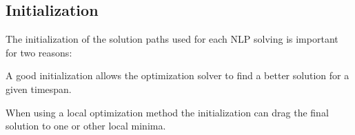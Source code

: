 \documentclass[eprint]{actapoly}
\begin{document}








\subsection{Initialization}


The initialization of the solution paths used for each NLP solving is important for two reasons:
\begin{itmeze}
 \item
A good initialization allows the
optimization solver to find a better solution for a given timespan.
 \item
When using a local optimization method the initialization
can drag the final solution to one or other local minima.
\end{itmeze}
\end{document}
